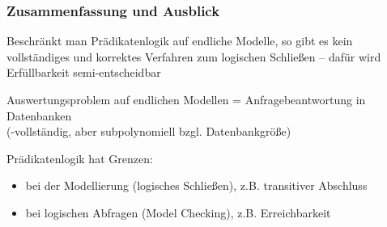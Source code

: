 \documentclass[aspectratio=1610,onlymath]{beamer}
\begin{document}
\begin{frame}\frametitle{Zusammenfassung und Ausblick}

Beschränkt man Prädikatenlogik auf endliche Modelle, so gibt es kein vollständiges und korrektes Verfahren zum logischen Schließen -- dafür wird Erfüllbarkeit semi-entscheidbar\bigskip

Auswertungsproblem auf endlichen Modellen = Anfragebeantwortung in Datenbanken\\
(\PSpace-vollständig, aber subpolynomiell bzgl. Datenbankgröße)\bigskip

Prädikatenlogik hat Grenzen: 
\begin{itemize}
\item bei der Modellierung (logisches Schließen), z.B. transitiver Abschluss
\item bei logischen Abfragen (Model Checking), z.B. Erreichbarkeit
\end{itemize}\bigskip


\end{frame}

% 
% 
% 
% 
% 
% 


% 
% 
\end{document}
